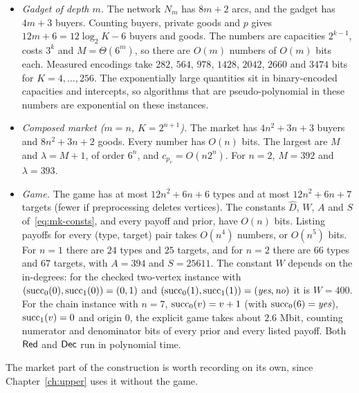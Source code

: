 \begin{itemize}[nosep]
\item \emph{Gadget of depth $m$.} The network $N_m$ has $8m+2$ arcs, and the gadget has $4m+3$ buyers.
Counting buyers, private goods and $p$ gives $12m+6=12\log_2K-6$ buyers and goods. The numbers are capacities
$2^{k-1}$, costs $3^k$ and $M=\Theta(6^m)$, so there are $O(m)$ numbers of $O(m)$ bits each. Measured
encodings take $282$, $564$, $978$, $1428$, $2042$, $2660$ and $3474$ bits for $K=4,\dots,256$. The
exponentially large quantities sit in binary-encoded capacities and intercepts, so algorithms that are
pseudo-polynomial in these numbers are exponential on these instances.
\item \emph{Composed market ($m=n$, $K=2^{n+1}$).} The market has $4n^2+3n+3$ buyers and $8n^2+3n+2$
goods. Every number has $O(n)$ bits. The largest are $M$ and $\lambda=M+1$, of order $6^n$, and
$c_{p_v}=O(n2^n)$. For $n=2$, $M=392$ and $\lambda=393$.
\item \emph{Game.} The game has at most $12n^2+6n+6$ types and at most $12n^2+6n+7$ targets (fewer if preprocessing
deletes vertices). The constants $\hat D$, $W$, $A$ and $S$ of~\eqref{eq:mk-consts}, and every payoff and
prior, have $O(n)$ bits. Listing payoffs for every (type, target) pair takes $O(n^4)$ numbers, or
$O(n^5)$ bits. For $n=1$ there are $24$ types and $25$ targets, and for $n=2$ there are $66$ types and
$67$ targets, with $A=394$ and $S=25611$. The constant $W$ depends on the in-degrees: for the checked
two-vertex instance with $(\mathrm{succ}_0(0),\mathrm{succ}_1(0))=(0,1)$ and $(\mathrm{succ}_0(1),\mathrm{succ}_1(1))=(\textit{yes},\textit{no})$ it is
$W=400$. For the chain instance with $n=7$, $\mathrm{succ}_0(v)=v+1$ (with $\mathrm{succ}_0(6)=\textit{yes}$), $\mathrm{succ}_1(v)=0$ and
origin $0$, the explicit game takes about $2.6$ Mbit, counting numerator and denominator bits of every
prior and every listed payoff.
Both $\mathsf{Red}$ and $\mathsf{Dec}$ run in polynomial time.
\end{itemize}

The market part of the construction is worth recording on its own, since Chapter~\ref{ch:upper} uses it
without the game.

